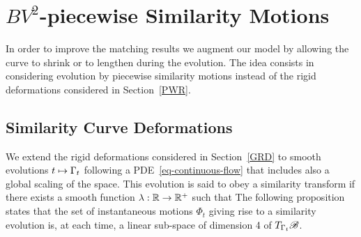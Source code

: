 \section{$BV^2$-piecewise Similarity Motions}\label{similarity}

In order to improve the matching results we augment our model by allowing the curve to shrink or to lengthen during the evolution. The idea consists in considering evolution by piecewise similarity motions instead of the rigid deformations considered in Section~\ref{PWR}.  

\subsection{Similarity Curve Deformations}

We extend the rigid deformations considered in Section~\ref{GRD} to smooth evolutions $t \mapsto \Gamma_t$ following a PDE~\eqref{eq-continuous-flow} that includes also a global scaling of the space. This evolution is said to obey a similarity transform if there exists a smooth function $\lambda : \mathbb{R} \rightarrow \mathbb{R}^+$ such that
The following proposition states that the set of instantaneous motions $\Phi_t$ giving rise to a similarity evolution  is, at each time, a linear sub-space of dimension 4 of $T_{\Gamma_t} \mathcal{B}$.

